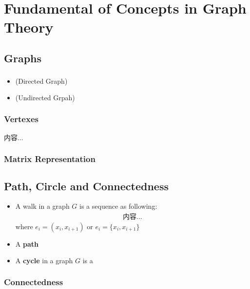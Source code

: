 \documentclass[Total.tex]{subfiles}
\begin{document}
	\chapter{Fundamental of Concepts in Graph Theory}
		
		\section{Graphs}
		
			\subsection{}
		
			\begin{Def}
				\begin{itemize}
					\item (Directed Graph)
					\item (Undirected Grpah)
				\end{itemize}
			\end{Def}
			
			\subsection{Vertexes}
			
			\begin{Def}
				内容...
			\end{Def}
			\subsection{Matrix Representation}
		\section{Path, Circle and Connectedness}
			\begin{Def}
				\begin{itemize}
					\item A walk in a graph $G$ is a sequence as following:
					\begin{gather*}
						内容...
					\end{gather*}
					where $e_i=(x_i,x_{i+1})$ or $e_{i}=\{x_i,x_{i+1}\}$
					\item A \textbf{path}
					\item A \textbf{cycle} in a graph $G$ is a 
				\end{itemize}
			\end{Def}
			\subsection{Connectedness}
\end{document}
